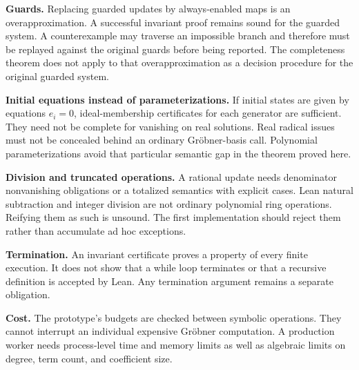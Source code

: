 \textbf{Guards.} Replacing guarded updates by always-enabled maps is an
overapproximation. A successful invariant proof remains sound for the guarded
system. A counterexample may traverse an impossible branch and therefore must
be replayed against the original guards before being reported. The completeness
theorem does not apply to that overapproximation as a decision procedure for the
original guarded system.

\textbf{Initial equations instead of parameterizations.} If initial states are
given by equations $e_i=0$, ideal-membership certificates for each generator are
sufficient. They need not be complete for vanishing on real solutions. Real
radical issues must not be concealed behind an ordinary Gr\"obner-basis call.
Polynomial parameterizations avoid that particular semantic gap in the theorem
proved here.

\textbf{Division and truncated operations.} A rational update needs denominator
nonvanishing obligations or a totalized semantics with explicit cases. Lean
natural subtraction and integer division are not ordinary polynomial ring
operations. Reifying them as such is unsound. The first implementation should
reject them rather than accumulate ad hoc exceptions.

\textbf{Termination.} An invariant certificate proves a property of every
finite execution. It does not show that a while loop terminates or that a
recursive definition is accepted by Lean. Any termination argument remains a
separate obligation.

\textbf{Cost.} The prototype's budgets are checked between symbolic operations.
They cannot interrupt an individual expensive Gr\"obner computation. A
production worker needs process-level time and memory limits as well as
algebraic limits on degree, term count, and coefficient size.
